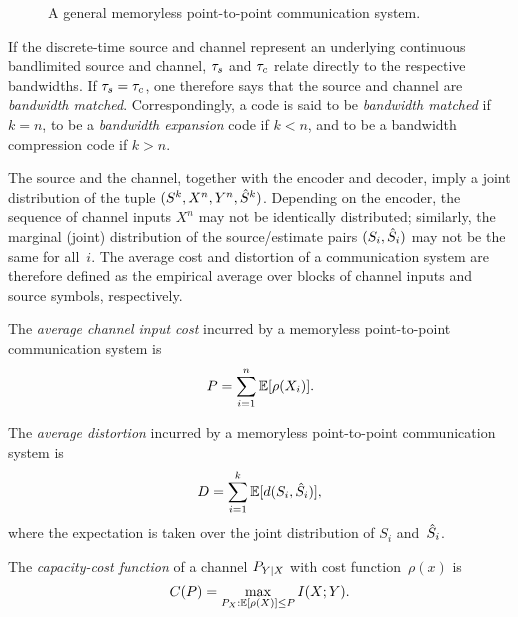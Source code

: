 \begin{figure}
  \begin{center}
    
  \end{center}
  \caption{A general memoryless point-to-point communication system.}
  \label{fig:scgen}
\end{figure}

If the discrete-time source and channel represent an underlying continuous
bandlimited source and channel, ${\tau_s}$ and ${\tau_c}$ relate directly to
the respective bandwidths. If ${\tau_s} = {\tau_c}$, one therefore says that the source
and channel are \emph{bandwidth matched}. Correspondingly, a code is said to be
\emph{bandwidth matched} if $k=n$, to be a \emph{bandwidth expansion} code if $k
< n$, and to be a bandwidth compression code if $k > n$. 

The source and the channel, together with the encoder and decoder, imply a joint
distribution of the tuple $(S^k, X^n, Y^n, {\hat{S}}^k)$.  Depending on the encoder,
the sequence of channel inputs $X^n$ may not be identically distributed;
similarly, the marginal (joint) distribution of the source/estimate pairs
$(S_i,{\hat{S}}_i)$ may not be the same for all~$i$. The average cost and distortion
of a communication system are therefore defined as the empirical average over
blocks of channel inputs and source symbols, respectively.

\begin{definition}
  \label{def:avgcost}
  The \emph{average channel input cost} incurred by a memoryless point-to-point
  communication system is
  \begin{equation*}
    P = \sum_{i=1}^n \mathbb{E}[\rho(X_i)].
  \end{equation*}
\end{definition}

\begin{definition}
  \label{def:avgdist}
  The \emph{average distortion} incurred by a memoryless point-to-point
  communication system is
  \begin{equation*}
    D = \sum_{i=1}^k \mathbb{E}[d(S_i, {\hat{S}}_i)],
  \end{equation*}
  where the expectation is taken over the joint distribution of $S_i$
  and~${\hat{S}}_i$.
\end{definition}

\begin{definition}
  \label{def:capacity}
  The \emph{capacity-cost function} of a channel $P_{Y|X}$ with cost
  function~$\rho(x)$ is
  \begin{equation*}
    C(P) = \max_{P_X: \mathbb{E}[\rho(X)] \le P} I(X;Y).
  \end{equation*}
\end{definition}


